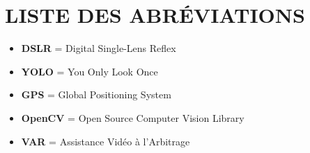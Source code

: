 \chapter*{LISTE DES ABRÉVIATIONS}
\adjustmtc
\thispagestyle{MyStyle}

\begin{itemize}[label=--]
	\item \textbf{DSLR} = Digital Single-Lens Reflex
	\item \textbf{YOLO} = You Only Look Once
	\item \textbf{GPS} = Global Positioning System
	\item \textbf{OpenCV} = Open Source Computer Vision Library
	\item \textbf{VAR} = Assistance Vidéo à l'Arbitrage
 
\end{itemize}
 























